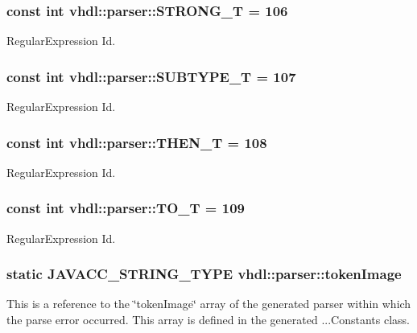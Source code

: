 \subsubsection[{S\+T\+R\+O\+N\+G\+\_\+\+T}]{\setlength{\rightskip}{0pt plus 5cm}const int vhdl\+::parser\+::\+S\+T\+R\+O\+N\+G\+\_\+\+T = 106}\label{namespacevhdl_1_1parser_a4d58cacc17a1309004d6b20aa0058e0c}
Regular\+Expression Id. \hypertarget{namespacevhdl_1_1parser_aae9a6801ee0c2adc65c89bb48106afbb}{}
\subsubsection[{S\+U\+B\+T\+Y\+P\+E\+\_\+\+T}]{\setlength{\rightskip}{0pt plus 5cm}const int vhdl\+::parser\+::\+S\+U\+B\+T\+Y\+P\+E\+\_\+\+T = 107}\label{namespacevhdl_1_1parser_aae9a6801ee0c2adc65c89bb48106afbb}
Regular\+Expression Id. \hypertarget{namespacevhdl_1_1parser_a9de66e8992d092c0fc67ef0e9e54eeb6}{}
\subsubsection[{T\+H\+E\+N\+\_\+\+T}]{\setlength{\rightskip}{0pt plus 5cm}const int vhdl\+::parser\+::\+T\+H\+E\+N\+\_\+\+T = 108}\label{namespacevhdl_1_1parser_a9de66e8992d092c0fc67ef0e9e54eeb6}
Regular\+Expression Id. \hypertarget{namespacevhdl_1_1parser_abd14d2d71967029b3e79dff4bbf345d9}{}
\subsubsection[{T\+O\+\_\+\+T}]{\setlength{\rightskip}{0pt plus 5cm}const int vhdl\+::parser\+::\+T\+O\+\_\+\+T = 109}\label{namespacevhdl_1_1parser_abd14d2d71967029b3e79dff4bbf345d9}
Regular\+Expression Id. \hypertarget{namespacevhdl_1_1parser_a2548f7c763a6da6b5dc5a887a92c297b}{}
\subsubsection[{token\+Image}]{\setlength{\rightskip}{0pt plus 5cm}static {\bf J\+A\+V\+A\+C\+C\+\_\+\+S\+T\+R\+I\+N\+G\+\_\+\+T\+Y\+P\+E} vhdl\+::parser\+::token\+Image}\label{namespacevhdl_1_1parser_a2548f7c763a6da6b5dc5a887a92c297b}
This is a reference to the \char`\"{}token\+Image\char`\"{} array of the generated parser within which the parse error occurred. This array is defined in the generated ...Constants class. \hypertarget{namespacevhdl_1_1parser_ad8ed05c3a8f328bb862adf5cdb68b390}{}
